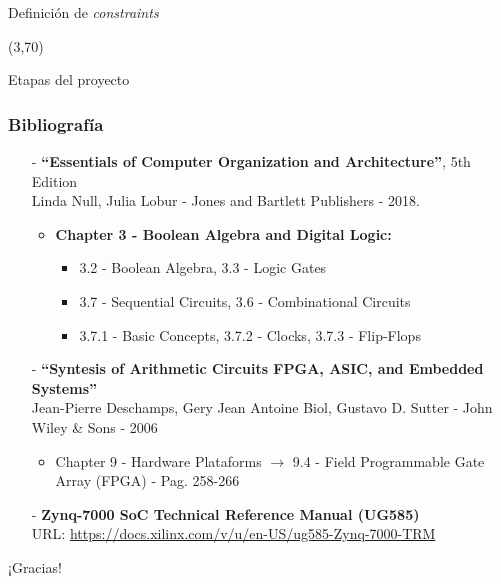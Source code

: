 \documentclass[aspectratio=169]{beamer}
\begin{document}
\begin{frame}[fragile,t]
\begin{textblock}{22}
\begin{tcolorbox}[size=small,width=\textwidth,colback={gray!50},title={}]
        \begin{center}
        \scriptsize Definición de \emph{constraints}
        \end{center}
        \end{tcolorbox}
    \end{textblock}
    \begin{textblock}{16}(3,70)
        \begin{tcolorbox}[size=small,width=\textwidth,colback={gray!50},title={}]
        \begin{center}
        \scriptsize Etapas del proyecto
        \end{center}
        \end{tcolorbox}
    \end{textblock}
\end{frame}

\begin{frame}[fragile]
    \frametitle{Bibliografía}
    \begin{itemize}
     \setlength\itemsep{0.4cm}
    \item[-] \textbf{“Essentials of Computer Organization and Architecture”}, 5th Edition\\
    Linda Null, Julia Lobur - Jones and Bartlett Publishers - 2018.\\
    \begin{itemize}
     \item \textbf{Chapter 3 - Boolean Algebra and Digital Logic:}
     \begin{itemize}
        \item 3.2 - Boolean Algebra, 3.3 - Logic Gates
        \item 3.7 - Sequential Circuits, 3.6 - Combinational Circuits
        \item 3.7.1 - Basic Concepts, 3.7.2 - Clocks, 3.7.3 - Flip-Flops
     \end{itemize}
    \end{itemize}
    \item[-] \textbf{``Syntesis of Arithmetic Circuits FPGA, ASIC, and Embedded Systems''}\\
    Jean-Pierre Deschamps, Gery Jean Antoine Biol, Gustavo D. Sutter - John Wiley \& Sons - 2006\\
    \begin{itemize}
    \item Chapter 9 - Hardware Plataforms $\rightarrow$ {\footnotesize 9.4 - Field Programmable Gate Array (FPGA) - Pag. 258-266}
    \end{itemize}
    \item[-] \small \textbf{Zynq-7000 SoC Technical Reference Manual (UG585)}\\
    URL: \url{https://docs.xilinx.com/v/u/en-US/ug585-Zynq-7000-TRM}
    \end{itemize}
\end{frame}

\begin{frame}[plain]
    \begin{center}
    \vspace{2cm}
    \huge ¡Gracias!\\
    \vspace{2cm}
    \end{center}
\end{frame}
\end{document}
